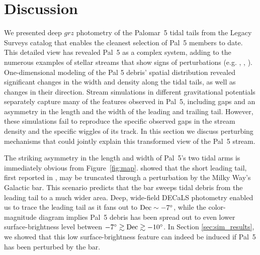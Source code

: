 \documentclass[twocolumn]{aastex62}
\newcommand{\sa}[1]{{\color{magenta} SP: #1}}
\begin{document}
%


\section{Discussion}
\label{sec:discussion}
We presented deep $grz$ photometry of the Palomar~5 tidal tails from the Legacy Surveys catalog that enables the cleanest selection of Pal~5 members to date. This detailed view has revealed Pal~5 as a complex system, adding to the numerous examples of stellar streams that show signs of perturbations (e.g. \citealt{Sesar:2016}, \citealt{Price-Whelan:2018}, \citealt{Bonaca:2019a}). 
One-dimensional modeling of the Pal 5 debris' spatial distribution revealed significant changes in the width and density along the tidal tails, as well as changes in their direction.
Stream simulations in different gravitational potentials separately capture many of the features observed in Pal~5, including gaps and an asymmetry in the length and the width of the leading and trailing tail.
However, these simulations fail to reproduce the specific observed gaps in the stream density and the specific wiggles of its track.
In this section we discuss perturbing mechanisms that could jointly explain this transformed view of the Pal~5 stream.

The striking asymmetry in the length and width of Pal~5's two tidal arms is immediately obvious from Figure~\ref{fig:map}.
\citet{Pearson:2017} showed that the short leading tail, first reported in \citet{Bernard:2016}, may be truncated through a perturbation by the Milky Way's Galactic bar.
This scenario predicts that the bar sweeps tidal debris from the leading tail to a much wider area.
Deep, wide-field DECaLS photometry enabled us to trace the leading tail as it fans out to $\rm Dec\sim-7^\circ$, while the color-magnitude diagram implies Pal~5 debris has been spread out to even lower surface-brightness level between $-7^\circ\gtrsim\rm Dec\gtrsim-10^\circ$.
In Section \ref{sec:sim_results}, we showed that this low surface-brightness feature can indeed be induced if Pal~5 has been perturbed by the bar.
\end{document}
